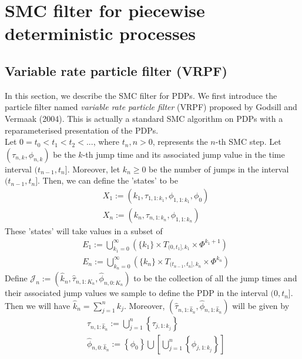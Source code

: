 \documentclass[12pt,a4paper]{article}
\begin{document}
\section{SMC filter for piecewise deterministic processes}
\subsection{Variable rate particle filter (VRPF)}
In this section, we describe the SMC filter for PDPs. We first introduce the particle filter named \textit{variable rate particle filter} (VRPF) proposed by Godsill and Vermaak (2004). This is actually a standard SMC algorithm on PDPs with a reparameterised presentation of the PDPs.\\
Let $0=t_0 < t_1 < t_2 <... $, where $t_n, n>0$, represents the $n$-th SMC step. Let $\left(\tau_{n,k},\phi_{n,k}\right)$ be the $k$-th jump time and its associated jump value in the time interval $(t_{n-1},t_n]$. Moreover, let $k_n \geq 0$ be the number of jumps in the interval $(t_{n-1},t_n]$. Then, we can define the 'states' to be 
\begin{subequations}
\begin{align}
\label{def:VRPF_States}
    &X_1 := \left(k_1,\tau_{1,1:k_1},\phi_{1,1:k_1},\phi_0\right) \\
    &X_n := \left(k_n,\tau_{n,1:k_n},\phi_{1,1:k_n}\right)
\end{align}
\end{subequations}
These 'states' will take values in a subset of
\begin{subequations}
\begin{align}
    &E_1 := \bigcup_{k_1=0}^{\infty} \left(\{k_1\}\times T_{(0,t_1],k_1} \times \Phi^{k_1+1}\right)\label{VRPF Support 1}\\
    &E_n := \bigcup_{k_n=0}^{\infty} \left(\{k_n\} \times T_{(t_{n-1},t_n],k_n} \times \Phi^{k_n} \right)\label{def:VRPF Support 2}
\end{align}
\end{subequations}
Define $\mathcal{J}_n := \left(\hat{k}_n,\hat{\tau}_{n,1:K_n},\hat{\phi}_{n,0:K_n}\right)$ to be the collection of all the jump times and their associated jump values we sample to define the PDP in the interval $(0,t_n]$. Then we will have $\hat{k}_n = \sum_{j=1}^{n} k_j$. Moreover, $\left(\hat{\tau}_{n,1:\hat{k}_n},\hat{\phi}_{n,1:\hat{k}_n}\right)$ will be given by
\begin{subequations}
\begin{align}
    & \hat{\tau}_{n,1:\hat{k}_n} := \bigcup_{j=1}^{n} \left\{\tau_{j,1:k_j}\right\} \label{def:VRPF_Path_tau}\\
    & \hat{\phi}_{n,0:\hat{k}_n} := \left\{\phi_0\right\}\bigcup\left[\bigcup_{j=1}^{n} \left\{\phi_{j,1:k_j}\right\}\right] \label{def:VRPF_Path_phi}
\end{align}
\end{subequations}
\end{document}
